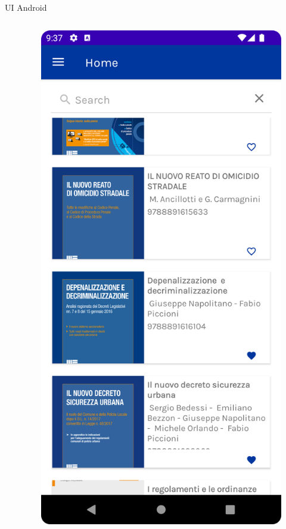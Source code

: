 \begin{frame}{UI Android}
\begin{columns}[onlytextwidth]
\begin{column}{0.24\textwidth}
        \end{column}
        \begin{column}{0.24\textwidth}
        
            \begin{figure}[H]
                \includegraphics[width=1\textwidth]{img/home.png}
            \end{figure}
            

\end{column}
\end{columns}
\end{frame}

